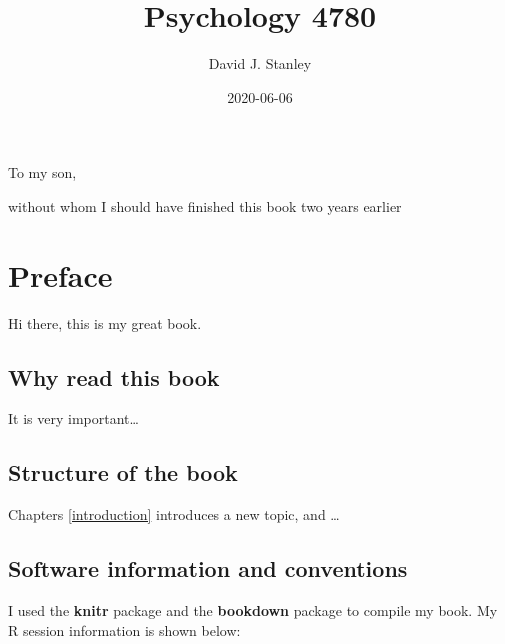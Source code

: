 \documentclass[
]{krantz}
\title{Psychology 4780}
\author{David J. Stanley}
\date{2020-06-06}
\begin{document}
\maketitle


\thispagestyle{empty}

\begin{center}
To my son,

without whom I should have finished this book two years earlier
\end{center}

\setlength{\abovedisplayskip}{-5pt}
\setlength{\abovedisplayshortskip}{-5pt}

{
\hypersetup{linkcolor=}
\setcounter{tocdepth}{2}
\tableofcontents
}
\listoftables
\listoffigures
\hypertarget{preface}{%
\chapter*{Preface}\label{preface}}


Hi there, this is my great book.

\hypertarget{why-read-this-book}{%
\section*{Why read this book}\label{why-read-this-book}}


It is very important\ldots{}

\hypertarget{structure-of-the-book}{%
\section*{Structure of the book}\label{structure-of-the-book}}


Chapters \ref{introduction} introduces a new topic, and \ldots{}

\hypertarget{software-information-and-conventions}{%
\section*{Software information and conventions}\label{software-information-and-conventions}}


I used the \textbf{knitr} package \citep{xie2015} and the \textbf{bookdown} package \citep{R-bookdown} to compile my book. My R session information is shown below:
\end{document}
